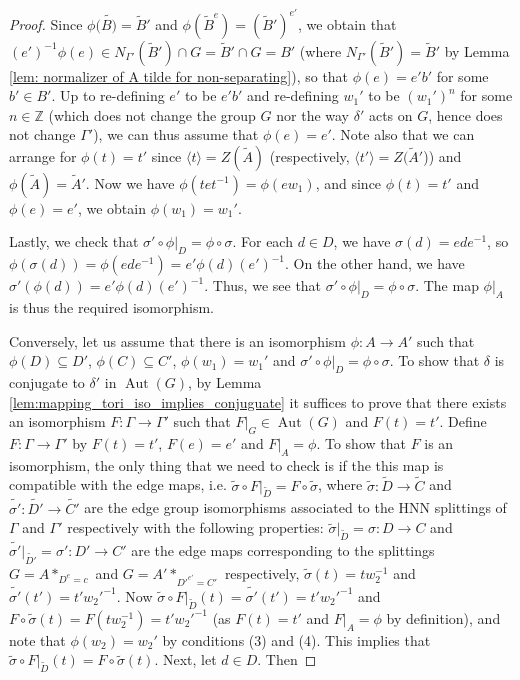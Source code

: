 \documentclass{amsart}
\newcommand{\Z}{\mathbb{Z}}
\DeclareMathOperator{\Aut}{Aut}
\theoremstyle{plain}
\theoremstyle{definition}
\theoremstyle{remark}
\begin{document}
\begin{proof}
Since $\phi(\tilde{B)} = \tilde{B}'$ and $\phi(\tilde{B}^e) = (\tilde{B}')^{e'}$, we obtain that $(e')^{-1}\phi(e) \in N_{\Gamma'}(\tilde{B}') \cap G = \tilde{B}' \cap G = B'$ (where $N_{\Gamma'}(\tilde{B}') = \tilde{B}'$ by Lemma \ref{lem: normalizer of A tilde for non-separating}), so that $\phi(e) = e' b'$ for some $b' \in B'$. Up to re-defining $e'$ to be $e'b'$ and re-defining $w_1'$ to be $(w_1')^{n}$ for some $n \in \Z$ (which does not change the group $G$ nor the way $\delta'$ acts on $G$, hence does not change $\Gamma'$), we can thus assume that $\phi(e) = e'$. Note also that we can arrange for $\phi(t) = t'$ since $\langle t \rangle = Z(\tilde{A})$ (respectively, $\langle t' \rangle = Z(\tilde{A}'$)) and $\phi(\tilde{A}) = \tilde{A}'$. Now we have $\phi(tet^{-1}) = \phi(ew_1)$, and since $\phi(t) = t'$ and $\phi(e) = e'$, we obtain $\phi(w_1) = w_1'$.

Lastly, we check that $\sigma' \circ \phi \vert_D = \phi \circ \sigma$. For each $d \in D$, we have $\sigma(d) = ede^{-1}$, so $\phi(\sigma(d)) = \phi(ede^{-1}) = e' \phi(d) (e')^{-1}$. On the other hand, we have $\sigma'(\phi(d)) = e' \phi(d) (e')^{-1}$. Thus, we see that $\sigma' \circ \phi \vert_D = \phi \circ \sigma$. The map $\phi \vert_A$ is thus the required isomorphism.

\vspace{0.2in}

Conversely, let us assume that there is an isomorphism $\phi: A \to A'$ such that $\phi(D) \subseteq D'$, $\phi(C) \subseteq C'$, $\phi(w_1) = w_1'$ and  $\sigma' \circ \phi|_D = \phi \circ \sigma$. To show that $\delta$ is conjugate to $\delta'$ in $\Aut(G)$, by Lemma \ref{lem:mapping_tori_iso_implies_conjuguate} it suffices to prove that there exists an isomorphism $F: \Gamma \to \Gamma'$ such that $F|_G \in \Aut(G)$ and $F(t) = t'$. Define $F: \Gamma \to \Gamma'$ by $F(t) = t'$, $F(e) = e'$ and $F|_A = \phi$. To show that $F$ is an isomorphism, the only thing that we need to check is if the this map is compatible with the edge maps, i.e. $\tilde{\sigma} \circ F|_{\tilde{D}} = F \circ \tilde{\sigma}$, where $\tilde{\sigma}: \tilde{D} \to \tilde{C}$ and $\tilde{\sigma'}: \tilde{D'} \to \tilde{C'}$ are the edge group isomorphisms associated to the HNN splittings of $\Gamma$ and $\Gamma'$ respectively with the following properties: $\tilde{\sigma}|_{\tilde{D}} = \sigma: D \to C$ and $\tilde{\sigma'}|_{\tilde{D'}} = \sigma': D' \to C'$ are the edge maps corresponding to the splittings $G = A*_{D^e = c}$ and $G = A'*_{D'^{e'} = C'}$ respectively, $\tilde{\sigma}(t) = tw_2^{-1}$ and $\tilde{\sigma'}(t') = t'w_2'^{-1}$. Now $\tilde{\sigma} \circ F|_{\tilde{D}}(t) = \tilde{\sigma'}(t') = t'w_2'^{-1}$ and $F \circ \tilde{\sigma} (t) = F(tw_2^{-1})=t'w_2'^{-1}$ (as $F(t) = t'$ and $F|_A = \phi$ by definition), and note that $\phi(w_2) = w_2'$ by conditions (3) and (4). This implies that $\tilde{\sigma} \circ F|_{\tilde{D}}(t) = F \circ \tilde{\sigma}(t)$. Next, let $d \in D$. Then


\end{proof}
\end{document}

